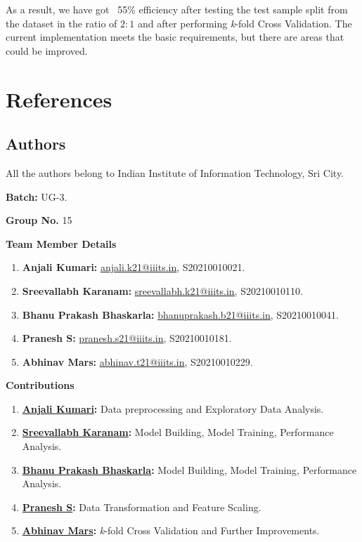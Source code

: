 \documentclass{article}
\begin{document}
\begin{justify}
As a result, we have got ~55\% efficiency after testing the test sample split from the dataset in the ratio of $2:1$ and after performing \textit{k}-fold Cross Validation. The current implementation meets the basic requirements, but there are areas that could be improved. 

\section{References}\label{sec:references}

\subsection{Authors}\label{authors}
\setlength{\leftskip}{.2cm}
All the authors belong to Indian Institute of Information Technology, Sri City. 

\setlength{\leftskip}{-.3cm}
\textbf{Batch:} UG-3.

\setlength{\leftskip}{-.3cm}
\textbf{Group No.} 15

\vspace{.5cm}
\setlength{\leftskip}{-.5cm}
\textbf{Team Member Details}

\begin{enumerate}
    \item \label{author:anjali} \textbf{Anjali Kumari:} \href{mailto:anjali.k21@iiits.in}{\underline{anjali.k21@iiits.in}}, S20210010021.
    \item \label{author:sreevallabh} \textbf{Sreevallabh Karanam:} \href{mailto:sreevallabh.k21@iiits.in}{\underline{sreevallabh.k21@iiits.in}}, S20210010110.
    \item \label{author:bhanu} \textbf{Bhanu Prakash Bhaskarla:} \href{mailto:bhanuprakash.b21@iiits.in}{\underline{bhanuprakash.b21@iiits.in}}, S20210010041.
    \item \label{author:pranesh} \textbf{Pranesh S:} \href{mailto:pranesh.s21@iiits.in}{\underline{pranesh.s21@iiits.in}}, S20210010181.
    \item \label{author:abhinav} \textbf{Abhinav Mars:} \href{mailto:abhinav.t21@iiits.in}{\underline{abhinav.t21@iiits.in}}, S20210010229.
\end{enumerate}

\setlength{\leftskip}{-.5cm}
\textbf{Contributions}

\begin{enumerate}
    \item \textbf{\hyperref[author:anjali]{Anjali Kumari}:} Data preprocessing and Exploratory Data Analysis.
    \item \textbf{\hyperref[author:sreevallabh]{Sreevallabh Karanam}:} Model Building, Model Training, Performance Analysis.
    \item \textbf{\hyperref[author:bhanu]{Bhanu Prakash Bhaskarla}:} Model Building, Model Training, Performance Analysis.
    \item \textbf{\hyperref[author:pranesh]{Pranesh S}:} Data Transformation and Feature Scaling.
    \item \textbf{\hyperref[author:abhinav]{Abhinav Mars}:} \textit{k}-fold Cross Validation and Further Improvements.
\end{enumerate}


\end{justify}
\end{document}
